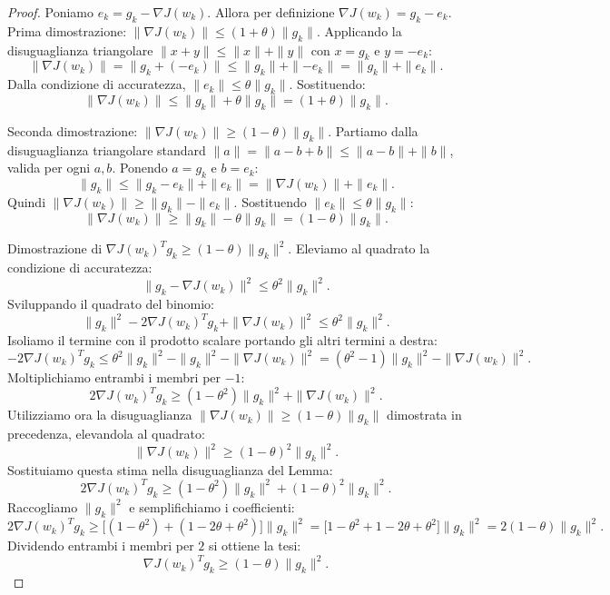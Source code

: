 \documentclass[a4paper,12pt]{article}
\begin{document}
\begin{proof}
  Poniamo $e_k = g_k - \nabla J(w_k)$. Allora per definizione $\nabla J(w_k) = g_k - e_k$.
  Prima dimostrazione: $\|\nabla J(w_k)\| \leq (1+\theta)\|g_k\|$.
  Applicando la disuguaglianza triangolare $\|x+y\| \leq \|x\| + \|y\|$ con $x = g_k$ e $y = -e_k$:
  \[
  \|\nabla J(w_k)\| = \|g_k + (-e_k)\| \leq \|g_k\| + \|{-e_k}\| = \|g_k\| + \|e_k\|.
  \]
  Dalla condizione di accuratezza, $\|e_k\| \leq \theta \|g_k\|$. Sostituendo:
  \[
  \|\nabla J(w_k)\| \leq \|g_k\| + \theta \|g_k\| = (1+\theta)\|g_k\|.
  \]

  Seconda dimostrazione: $\|\nabla J(w_k)\| \geq (1-\theta)\|g_k\|$.
  Partiamo dalla disuguaglianza triangolare standard $\|a\|=\|a-b+b\| \leq \|a-b\| + \|b\|$, valida per ogni $a,b$. Ponendo $a = g_k$ e $b = e_k$:
  \[
  \|g_k\| \leq \|g_k - e_k\| + \|e_k\| = \|\nabla J(w_k)\| + \|e_k\|.
  \]
  Quindi $\|\nabla J(w_k)\| \geq \|g_k\| - \|e_k\|$. Sostituendo $\|e_k\| \leq \theta \|g_k\|$:
  \[
  \|\nabla J(w_k)\| \geq \|g_k\| - \theta \|g_k\| = (1-\theta)\|g_k\|.
  \]

  Dimostrazione di $\nabla J(w_k)^T g_k \geq (1-\theta)\|g_k\|^2$.
  Eleviamo al quadrato la condizione di accuratezza:
  \[
  \|g_k - \nabla J(w_k)\|^2 \leq \theta^2 \|g_k\|^2.
  \]
  Sviluppando il quadrato del binomio:
  \[
  \|g_k\|^2 - 2\nabla J(w_k)^T g_k + \|\nabla J(w_k)\|^2 \leq \theta^2 \|g_k\|^2.
  \]
  Isoliamo il termine con il prodotto scalare portando gli altri termini a destra:
  \[
  -2\nabla J(w_k)^T g_k \leq \theta^2 \|g_k\|^2 - \|g_k\|^2 - \|\nabla J(w_k)\|^2 = (\theta^2 - 1)\|g_k\|^2 - \|\nabla J(w_k)\|^2.
  \]
  Moltiplichiamo entrambi i membri per $-1$:
  \[
  2\nabla J(w_k)^T g_k \geq (1 - \theta^2)\|g_k\|^2 + \|\nabla J(w_k)\|^2.
  \]
  Utilizziamo ora la disuguaglianza $\|\nabla J(w_k)\| \geq (1-\theta)\|g_k\|$ dimostrata in precedenza, elevandola al quadrato:
  \[
  \|\nabla J(w_k)\|^2 \geq (1-\theta)^2 \|g_k\|^2.
  \]
  Sostituiamo questa stima nella disuguaglianza del Lemma:
  \[
  2\nabla J(w_k)^T g_k \geq (1 - \theta^2)\|g_k\|^2 + (1-\theta)^2 \|g_k\|^2.
  \]
  Raccogliamo $\|g_k\|^2$ e semplifichiamo i coefficienti:
  \[
  2\nabla J(w_k)^T g_k \geq \bigl[(1 - \theta^2) + (1 - 2\theta + \theta^2)\bigr] \|g_k\|^2 = \bigl[1 - \theta^2 + 1 - 2\theta + \theta^2\bigr] \|g_k\|^2 = 2(1 - \theta) \|g_k\|^2.
  \]
  Dividendo entrambi i membri per $2$ si ottiene la tesi:
  \[
  \nabla J(w_k)^T g_k \geq (1-\theta) \|g_k\|^2.
  \]
\end{proof}
\newpage
\end{document}
